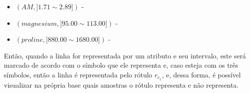 \begin{itemize}[noitemsep]
\item ${(AM, ] 1.71  \sim  2.89])}$ - \Square
\item ${(magnesium, ] 95.00 \sim  113.00])}$ - \XBox
\item ${(proline, ] 880.00 \sim 1680.00]) }$ - \Circle
\end{itemize}

\newpage


Então, quando a linha for representada por um atributo e seu intervalo, este será marcado de acordo com o símbolo que ele representa e, caso esteja com os três símbolos, então a linha é representada pelo rótulo ${r_{c_1}}$, e, dessa forma, é possível visualizar na própria base quais amostras o rótulo representa e não representa.
\begin{table}[!ht]
\centering 
\caption{Amostra da Base de Dados Wine com somente três atributos pertencentes ao \textit{cluster} 1 do algoritmo Naive Bayes}
\label{tab:wine:am_magnesium_proline}
\end{table}
